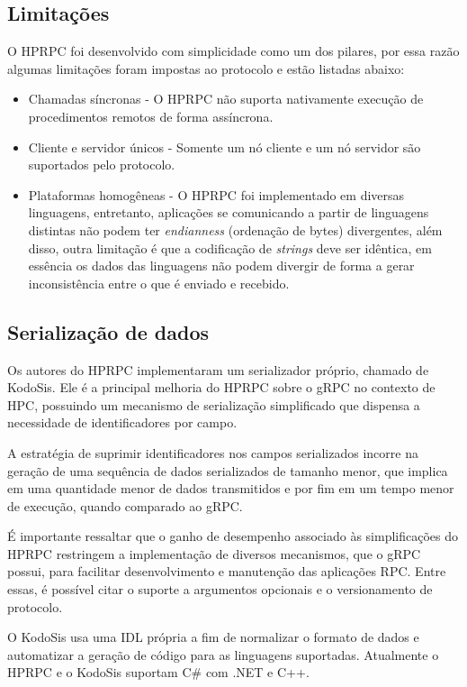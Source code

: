 \subsection{Limitações}

O HPRPC foi desenvolvido com simplicidade como um dos pilares, por essa razão algumas limitações foram impostas ao protocolo e estão listadas abaixo:

\begin{itemize}
	\item Chamadas síncronas - O HPRPC não suporta nativamente execução de procedimentos remotos de forma assíncrona.
	\item Cliente e servidor únicos - Somente um nó cliente e um nó servidor são suportados pelo protocolo.
	\item Plataformas homogêneas - O HPRPC foi implementado em diversas linguagens, entretanto, aplicações se comunicando a partir de linguagens distintas não podem ter \textit{endianness} (ordenação de bytes) divergentes, além disso, outra limitação é que a codificação de \emph{strings} deve ser idêntica, em essência os dados das linguagens não podem divergir de forma a gerar inconsistência entre o que é enviado e recebido.
\end{itemize}

\subsection{Serialização de dados}

Os autores do HPRPC implementaram um serializador próprio, chamado de KodoSis. Ele é a principal melhoria do HPRPC sobre o gRPC no contexto de HPC, possuindo um mecanismo de serialização simplificado que dispensa a necessidade de identificadores por campo.

A estratégia de suprimir identificadores nos campos serializados incorre na geração de uma sequência de dados serializados de tamanho menor, que implica em uma quantidade menor de dados transmitidos e por fim em um tempo menor de execução, quando comparado ao gRPC.

É importante ressaltar que o ganho de desempenho associado às simplificações do HPRPC restringem a implementação de diversos mecanismos, que o gRPC possui, para facilitar desenvolvimento e manutenção das aplicações RPC. Entre essas, é possível citar o suporte a argumentos opcionais e o versionamento de protocolo.

O KodoSis usa uma IDL própria a fim de normalizar o formato de dados e automatizar a geração de código para as linguagens suportadas. Atualmente o HPRPC e o KodoSis suportam C\# com .NET e C++.

